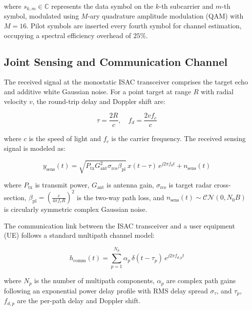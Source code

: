 \documentclass[conference]{IEEEtran}
\begin{document}
where $s_{k,m} \in \mathbb{C}$ represents the data symbol on the $k$-th subcarrier and $m$-th symbol, modulated using $M$-ary quadrature amplitude modulation (QAM) with $M=16$. Pilot symbols are inserted every fourth symbol for channel estimation, occupying a spectral efficiency overhead of $25\%$.

\subsection{Joint Sensing and Communication Channel}

The received signal at the monostatic ISAC transceiver comprises the target echo and additive white Gaussian noise. For a point target at range $R$ with radial velocity $v$, the round-trip delay and Doppler shift are:

\begin{equation}
    \tau = \frac{2R}{c}, \quad f_d = \frac{2v f_c}{c}
    \label{eq:delay_doppler}
\end{equation}

where $c$ is the speed of light and $f_c$ is the carrier frequency. The received sensing signal is modeled as:

\begin{equation}
    y_{\mathrm{sens}}(t) = \sqrt{P_{\mathrm{tx}} G_{\mathrm{ant}}^2 \sigma_{\mathrm{rcs}} \beta_{\mathrm{pl}}} \, x(t-\tau) \, e^{j2\pi f_d t} + n_{\mathrm{sens}}(t)
    \label{eq:rx_sensing}
\end{equation}

where $P_{\mathrm{tx}}$ is transmit power, $G_{\mathrm{ant}}$ is antenna gain, $\sigma_{\mathrm{rcs}}$ is target radar cross-section, $\beta_{\mathrm{pl}} = (\frac{c}{4\pi f_c R})^2$ is the two-way path loss, and $n_{\mathrm{sens}}(t) \sim \mathcal{CN}(0, N_0 B)$ is circularly symmetric complex Gaussian noise.

The communication link between the ISAC transceiver and a user equipment (UE) follows a standard multipath channel model:

\begin{equation}
    h_{\mathrm{comm}}(t) = \sum_{p=1}^{N_p} \alpha_p \, \delta(t - \tau_p) \, e^{j2\pi f_{d,p} t}
    \label{eq:comm_channel}
\end{equation}

where $N_p$ is the number of multipath components, $\alpha_p$ are complex path gains following an exponential power delay profile with RMS delay spread $\sigma_{\tau}$, and $\tau_p$, $f_{d,p}$ are the per-path delay and Doppler shift.
\end{document}
